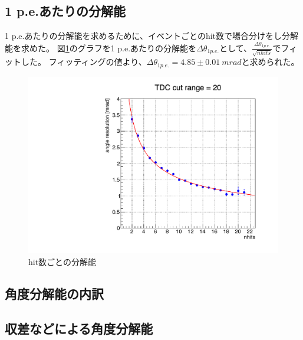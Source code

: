 \documentclass[uplatex, titlepage, dvipdfmx, 12pt, a4paper]{jsreport}
\begin{document}
    \subsection{1 p.e.あたりの分解能}
    1 p.e.あたりの分解能を求めるために、イベントごとのhit数で場合分けをし分解能を求めた。
    図\ref{fig:per_hit}のグラフを1 p.e.あたりの分解能を$\Delta \theta_{1 p.e.}$として、$\frac{\Delta \theta_{1 p.e.}}{\sqrt{nhits}}$でフィットした。
    フィッティングの値より、$\Delta \theta_{1 p.e.} = 4.85 \pm 0.01 \: \si{mrad}$と求められた。
    \begin{figure}[h]
      \begin{center} 
        \includegraphics[scale=0.4, clip]{image/per_hit.pdf}
        \caption{hit数ごとの分解能} 
        \label{fig:per_hit} 
      \end{center}
    \end{figure}
    
    
    
    \subsection{角度分解能の内訳}
    
    \subsection{収差などによる角度分解能}
    
\end{document}
